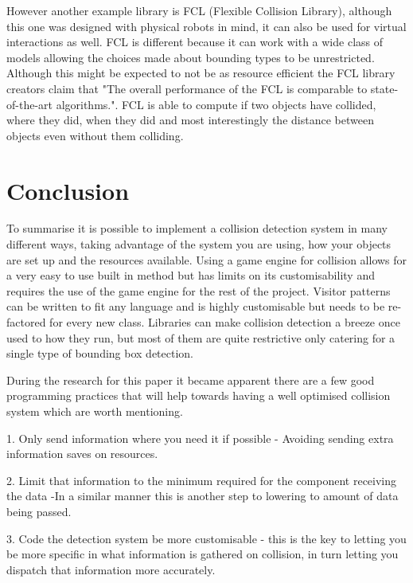 \documentclass{scrartcl}
\begin{document}
	However another example library is FCL (Flexible Collision Library)\cite{pan2012fcl}, although this one was designed with physical robots in mind, it can also be used for virtual interactions as well. FCL is different because it can work with a wide class of models allowing the choices made about bounding types to be unrestricted. Although this might be expected to not be as resource efficient the FCL library creators claim that "The overall performance of the FCL is comparable to state-of-the-art algorithms."\cite{pan2012fcl}. FCL is able to compute if two objects have collided, where they did, when they did and most interestingly the distance between objects even without them colliding.
	
	
	\section{Conclusion}
	
	To summarise it is possible to implement a collision detection system in many different ways, taking advantage of the system you are using, how your objects are set up and the resources available. Using a game engine for collision allows for a very easy to use built in method but has limits on its customisability and requires the use of the game engine for the rest of the project. Visitor patterns can be written to fit any language and is highly customisable but needs to be re-factored for every new class. Libraries can make collision detection a breeze once used to how they run, but most of them are quite restrictive only catering for a single type of bounding box detection.
	
	During the research for this paper it became apparent there are a few good programming practices that will help towards having a well optimised collision system which are worth mentioning. 
	
	1. Only send information where you need it if possible - Avoiding sending extra information saves on resources.
	
	2. Limit that information to the minimum required for the component receiving the data -In a similar manner this is another step to lowering to amount of data being passed.
	
	3. Code the detection system be more customisable - this is the key to letting you be more specific in what information is gathered on collision, in turn letting you dispatch that information more accurately.

	
	
	
	
	
\end{document}
